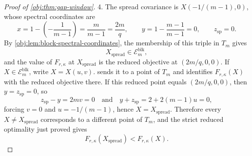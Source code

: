 \begin{proof}[Proof of \cref{obj:thm:gap-window}]
4.  The spread covariance is \(X(-1/(m-1),0)\), whose spectral coordinates are
\[
x=1-\left(-\frac1{m-1}\right)=\frac{m}{m-1}=\frac{2m}{q},\qquad
y=1-\frac{m-1}{m-1}=0,\qquad
z_{\mathrm{sp}}=0.
\]
By \cref{obj:lem:block-spectral-coordinates}, the membership of this triple in \(T_m\) gives
\[
X_{\mathrm{spread}}\in\mathcal E_m^{\mathrm{blk}},
\]
and the value of \(F_{r,\kappa}\) at \(X_{\mathrm{spread}}\) is the reduced objective at
\((2m/q,0,0)\). If \(X\in\mathcal E_m^{\mathrm{blk}}\), write \(X=X(u,v)\).  sends it to a point of \(T_m\) and identifies \(F_{r,\kappa}(X)\) with the reduced objective there. If this reduced point equals \((2m/q,0,0)\), then \(y=z_{\mathrm{sp}}=0\), so
\[
z_{\mathrm{sp}}-y=2mv=0
\quad\text{and}\quad
y+z_{\mathrm{sp}}=2+2(m-1)u=0,
\]
forcing \(v=0\) and \(u=-1/(m-1)\), hence \(X=X_{\mathrm{spread}}\). Therefore every \(X\ne X_{\mathrm{spread}}\) corresponds to a different point of \(T_m\), and the strict reduced optimality just proved gives
\[
F_{r,\kappa}(X_{\mathrm{spread}})<F_{r,\kappa}(X).
\]  %


\end{proof}
